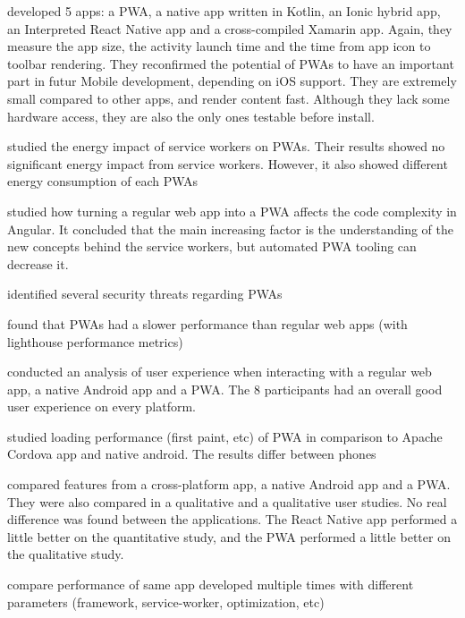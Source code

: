     \cite{Biorn-Hansen2} developed 5 apps: a PWA, a native app written in Kotlin, an Ionic hybrid app, an Interpreted React Native app and a cross-compiled Xamarin app. Again, they measure the app size, the activity launch time and the time from app icon to toolbar rendering. They reconfirmed the potential of PWAs to have an important part in futur Mobile development, depending on iOS support. They are extremely small compared to other apps, and render content fast. Although they lack some hardware access, they are also the only ones testable before install. 
    
    \cite{SW_and_energy} studied the energy impact of service workers on PWAs. Their results showed no significant energy impact from service workers. However, it also showed different energy consumption of each PWAs
    
    \cite{JohannsenFabian2018PWAa} studied how turning a regular web app into a PWA affects the code complexity in Angular. It concluded that the main increasing factor is the understanding of the new concepts behind the service workers, but automated PWA tooling can decrease it.
    
    \cite{Pride_Prejudice} identified several security threats regarding PWAs
    
    \cite{bac_pwa_comparison} found that PWAs had a slower performance than regular web apps (with lighthouse performance metrics)
    
    \cite{PWA_UX_comparison_study} conducted an analysis of user experience when interacting with a regular web app, a native Android app and a PWA. The 8 participants had an overall good user experience on every platform.
    
    \cite{bac_pwa_performance} studied loading performance (first paint, etc) of PWA in comparison to Apache Cordova app and native android. The results differ between phones %
    
    \cite{emulating_native_w_crossplatform} compared features from a cross-platform app, a native Android app and a PWA. They were also compared in a qualitative and a qualitative user studies. No real difference was found between the applications. The React Native app performed a little better on the quantitative study, and the PWA performed a little better on the qualitative study.
    
    \cite{PWADatabase} compare performance of same app developed multiple times with different parameters (framework, service-worker, optimization, etc)
    
